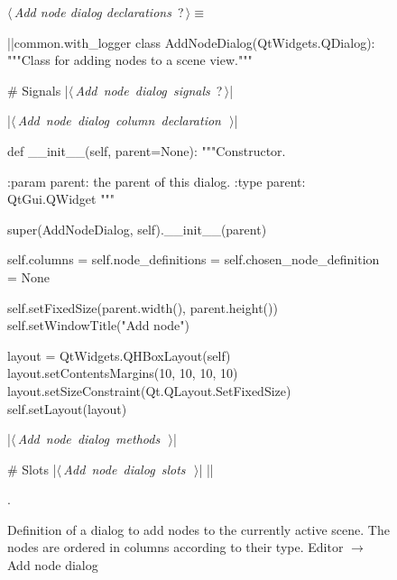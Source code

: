 \documentclass[%
    a4paper,    %
    justified,  %
    nobib,      %
    openany     %
]{tufte-book}
\makeatletter
\renewcommand{\label}[1]{\@tufte@label{##1}}%
\makeatother
\begin{document}
\begin{figure}
\begin{flushleft} \small
\begin{minipage}{\linewidth}\label{scrap148}\raggedright\small
{} $\langle\,${\itshape Add node dialog declarations}\nobreak\ {\footnotesize {?}}$\,\rangle\equiv$
\vspace{-1ex}
\begin{pythoncode}
|\normalfont{}\fontfamily{}|common.with_logger
class AddNodeDialog(QtWidgets.QDialog):
    """Class for adding nodes to a scene view."""

    # Signals
    |\hbox{$\langle\,${\itshape Add node dialog signals}\nobreak\ {\footnotesize ?}$\,\rangle$}|

    |\hbox{$\langle\,${\itshape Add node dialog column declaration}\nobreak\ {\footnotesize {}}$\,\rangle$}|

    def __init__(self, parent=None):
        """Constructor.

        :param parent: the parent of this dialog.
        :type  parent: QtGui.QWidget
        """

        super(AddNodeDialog, self).__init__(parent)

        self.columns                = {}
        self.node_definitions       = {}
        self.chosen_node_definition = None

        self.setFixedSize(parent.width(), parent.height())
        self.setWindowTitle("Add node")

        layout = QtWidgets.QHBoxLayout(self)
        layout.setContentsMargins(10, 10, 10, 10)
        layout.setSizeConstraint(Qt.QLayout.SetFixedSize)
        self.setLayout(layout)

    |\hbox{$\langle\,${\itshape Add node dialog methods}\nobreak\ {\footnotesize {}}$\,\rangle$}|

    # Slots
    |\hbox{$\langle\,${\itshape Add node dialog slots}\nobreak\ {\footnotesize {}}$\,\rangle$}|
|\NWsep|
\end{pythoncode}
\vspace{1.5ex}
\footnotesize
\begin{list}{}{\setlength{\itemsep}{-\parsep}\setlength{\itemindent}{-\leftmargin}}
\item {\NWtxtMacroNoRef}.

\item{}
\end{list}
\end{minipage}\vspace{4ex}
\end{flushleft}
\caption{Definition of a dialog to add nodes to the currently active scene. The
  nodes are ordered in columns according to their type.
  \newline{}\newline{}Editor $\rightarrow$ Add node dialog}
\label{editor:lst:add-node-dialog}
\end{figure}
\end{document}
